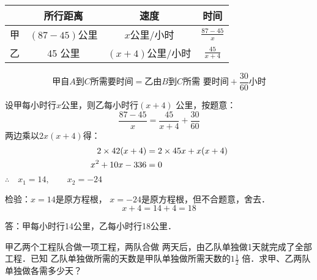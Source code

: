 \begin{analyze}
\begin{center}
\end{center}
\begin{center}
\begin{tabular}{cccc}
    \hline
    & 所行距离 &  速度 & 时间\\
    \hline
    甲&    $(87-45)$公里&    $x$公里/小时   & $\tfrac{87-45}{x}$   \\
    乙& 45 公里&     $(x+4)$公里/小时&    $\tfrac{45}{x+4}$   \\
    \hline
\end{tabular}    
\end{center}

\[\text{甲自$A$到$C$所需要时间}=\text{乙由$B$到$C$所需
要时间}+\frac{30}{60}\text{小时}\]
\end{analyze}

\begin{solution}
    设甲每小时行$x$公里，则乙每小时行$(x+4)$
公里，按题意：
\[\frac{87-45}{x}=\frac{45}{x+4}+\frac{30}{60}  \]
两边乘以$2x(x+4)$得：
\[\begin{split}
    2\times 42(x+4) &=2\times 45x+x(x+4)\\
    x^2+10x-336&=0
\end{split}\]
$\therefore\quad x_1=14,\qquad x_2=-24$

检验：$x=14$是原方程根，
$x=-24$是原方程根，但不合题意，舍去．
\[x+4=14+4=18\]

答：甲每小时行14公里，乙每小时行18公里．
\end{solution}

\begin{example}
    甲乙两个工程队合做一项工程，两队合做
两天后，由乙队单独做1天就完成了全部工程．已知
乙队单独做所需的天数是甲队单独做所需天数的$1\frac{1}{2}$
倍．求甲、乙两队单独做各需多少天？
\end{example}


